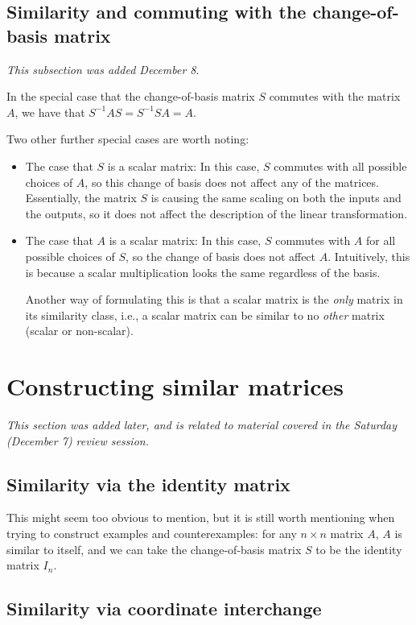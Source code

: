 \documentclass[10pt]{amsart}
\begin{document}
\subsection{Similarity and commuting with the change-of-basis matrix}

{\em This subsection was added December 8}.

In the special case that the change-of-basis matrix $S$ commutes with
the matrix $A$, we have that $S^{-1}AS = S^{-1}SA = A$.

Two other further special cases are worth noting:

\begin{itemize}
\item The case that $S$ is a scalar matrix: In this case, $S$ commutes
  with all possible choices of $A$, so this change of basis does not
  affect any of the matrices. Essentially, the matrix $S$ is causing
  the same scaling on both the inputs and the outputs, so it does not
  affect the description of the linear transformation.
\item The case that $A$ is a scalar matrix: In this case, $S$ commutes
  with $A$ for all possible choices of $S$, so the change of basis
  does not affect $A$. Intuitively, this is because a scalar
  multiplication looks the same regardless of the basis.

  Another way of formulating this is that a scalar matrix is the {\em
    only} matrix in its similarity class, i.e., a scalar matrix can be
  similar to no {\em other} matrix (scalar or non-scalar).
\end{itemize}

\section{Constructing similar matrices}

{\em This section was added later, and is related to material covered
  in the Saturday (December 7) review session.}

\subsection{Similarity via the identity matrix}

This might seem too obvious to mention, but it is still worth
mentioning when trying to construct examples and counterexamples: for
any $n \times n$ matrix $A$, $A$ is similar to itself, and we can take
the change-of-basis matrix $S$ to be the identity matrix $I_n$.
\subsection{Similarity via coordinate interchange}\label{sec:similarity-via-coordinate-interchange}
\end{document}
